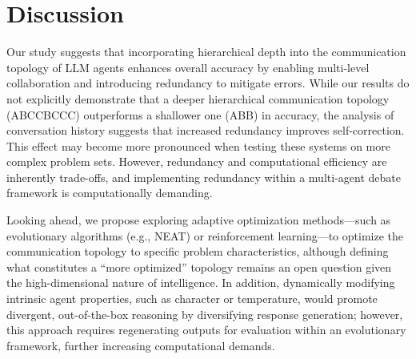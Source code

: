 \section{Discussion}
\label{sec:discussion}

Our study suggests that incorporating hierarchical depth into the communication topology of LLM agents enhances overall accuracy by enabling multi-level collaboration and introducing redundancy to mitigate errors. While our results do not explicitly demonstrate that a deeper hierarchical communication topology (ABCCBCCC) outperforms a shallower one (ABB) in accuracy, the analysis of conversation history suggests that increased redundancy improves self-correction. This effect may become more pronounced when testing these systems on more complex problem sets. However, redundancy and computational efficiency are inherently trade-offs, and implementing redundancy within a multi-agent debate framework is computationally demanding.

Looking ahead, we propose exploring adaptive optimization methods—such as evolutionary algorithms (e.g., NEAT\cite{stanley:ec02}) or reinforcement learning—to optimize the communication topology to specific problem characteristics, although defining what constitutes a “more optimized” topology remains an open question given the high-dimensional nature of intelligence. In addition, dynamically modifying intrinsic agent properties, such as character or temperature, would promote divergent, out-of-the-box reasoning by diversifying response generation\cite{liang2024encouragingdivergentthinkinglarge}; however, this approach requires regenerating outputs for evaluation within an evolutionary framework, further increasing computational demands.